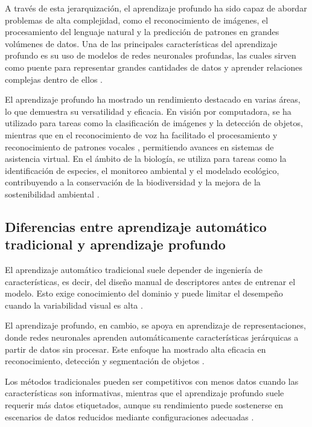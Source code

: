 A través de esta jerarquización, el aprendizaje profundo ha sido capaz de abordar problemas de alta complejidad, como el reconocimiento de imágenes, el procesamiento del lenguaje natural y la predicción de patrones en grandes volúmenes de datos. Una de las principales características del aprendizaje profundo es su uso de modelos de redes neuronales profundas, las cuales sirven como puente para representar grandes cantidades de datos y aprender relaciones complejas dentro de ellos \parencite{sharma2020deepintro}.

El aprendizaje profundo ha mostrado un rendimiento destacado en varias áreas, lo que demuestra su versatilidad y eficacia. En visión por computadora, se ha utilizado para tareas como la clasificación de imágenes y la detección de objetos, mientras que en el reconocimiento de voz ha facilitado el procesamiento y reconocimiento de patrones vocales \parencite{zulkernine2020tutorial}, permitiendo avances en sistemas de asistencia virtual. En el ámbito de la biología, se utiliza para tareas como la identificación de especies, el monitoreo ambiental y el modelado ecológico, contribuyendo a la conservación de la biodiversidad y la mejora de la sostenibilidad ambiental \parencite{borowiec2022deep}.

\subsection{Diferencias entre aprendizaje automático tradicional y aprendizaje profundo}

El aprendizaje automático tradicional suele depender de ingeniería de características, es decir, del diseño manual de descriptores antes de entrenar el modelo. Esto exige conocimiento del dominio y puede limitar el desempeño cuando la variabilidad visual es alta \parencite{rajasree2025feature,chen2024tradeoff}.

El aprendizaje profundo, en cambio, se apoya en aprendizaje de representaciones, donde redes neuronales aprenden automáticamente características jerárquicas a partir de datos sin procesar. Este enfoque ha mostrado alta eficacia en reconocimiento, detección y segmentación de objetos \parencite{khastavaneh2020representation}.

Los métodos tradicionales pueden ser competitivos con menos datos cuando las características son informativas, mientras que el aprendizaje profundo suele requerir más datos etiquetados, aunque su rendimiento puede sostenerse en escenarios de datos reducidos mediante configuraciones adecuadas \parencite{edwin2022smallscale,rajasree2025feature}.

